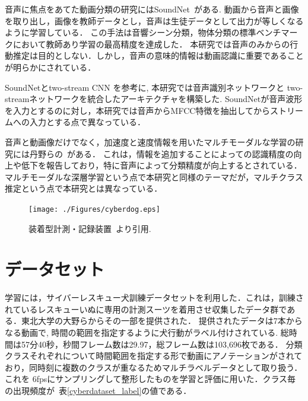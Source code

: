 \documentclass[MIRU,submit]{miru2019j}
\begin{document}
音声に焦点をあてた動画分類の研究にはSoundNet~\cite{aytar2016soundnet}がある.
動画から音声と画像を取り出し，画像を教師データとし，音声は生徒データとして出力が等しくなるように学習している．
この手法は音響シーン分類，物体分類の標準ベンチマークにおいて教師あり学習の最高精度を達成した．
本研究では音声のみからの行動推定は目的としない．しかし，音声の意味的情報は動画認識に重要であることが明らかにされている．

SoundNetとtwo-stream CNN を参考に, 本研究では音声識別ネットワークと two-streamネットワークを統合したアーキテクチャを構築した.
SoundNetが音声波形を入力とするのに対し，本研究では音声からMFCC特徴を抽出してからストリームへの入力とする点で異なっている．

音声と動画像だけでなく，加速度と速度情報を用いたマルチモーダルな学習の研究には丹野らの~\cite{tanno2019deim}がある．
これは，情報を追加することによっての認識精度の向上や低下を報告しており，特に音声によって分類精度が向上するとされている．
マルチモーダルな深層学習という点で本研究と同様のテーマだが，マルチクラス推定という点で本研究とは異なっている．

\begin{figure}[tb]
 \begin{center}
  \texttt{[image: ./Figures/cyberdog.eps]}
  \caption{装着型計測・記録装置~\cite{dog01}より引用.}
  \label{cyber}
 \end{center}
\end{figure}

\section{データセット}
学習には，サイバーレスキュー犬訓練データセットを利用した．これは，訓練されているレスキューいぬに専用の計測スーツを着用させ収集したデータ群である．東北大学の大野らからその一部を提供された．
提供されたデータは7本からなる動画で, 時間の範囲を指定するように犬行動がラベル付けされている.
総時間は57分40秒，秒間フレーム数は29.97，総フレーム数は103,696枚である．
分類クラスそれぞれについて時間範囲を指定する形で動画にアノテーションがされており，同時刻に複数のクラスが重なるためマルチラベルデータとして取り扱う．
これを 6fpsにサンプリングして整形したものを学習と評価に用いた．クラス毎の出現頻度が~表\ref{cyberdataset_label}の値である．
\end{document}
